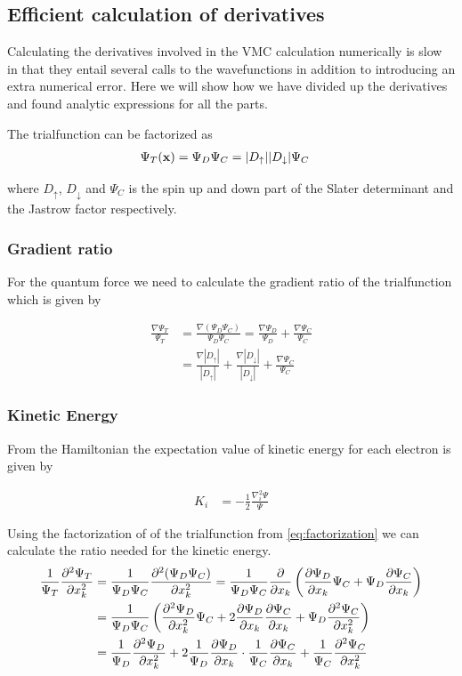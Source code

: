 \documentclass[11pt]{article}
\begin{document}
	\subsection{Efficient calculation of derivatives}
		Calculating the derivatives involved in the VMC calculation numerically is slow in that they entail several calls to the wavefunctions in addition to introducing an extra numerical error. Here we will show how we have divided up the derivatives and found analytic expressions for all the parts.

		The trialfunction can be factorized as
		\begin{align}
			\Psi_T(\vb{x}) &= \Psi_{D} \Psi_C= |D_\uparrow| |D_\downarrow| \Psi_C \label{eq:factorization}
		\end{align}

		where \(D_\uparrow\), \(D_\downarrow\) and \(\Psi_C\) is the spin up and down part of the Slater determinant and the Jastrow factor respectively.

		\subsubsection{Gradient ratio}
			For the quantum force we need to calculate the gradient ratio of the trialfunction which is given by

			\begin{align}
				\frac{\nabla \Psi_T}{ \Psi_T } &= \frac{\nabla( \Psi_D\Psi_C  )}{ \Psi_D\Psi_C } = \frac{ \nabla \Psi_D }{\Psi_D } + \frac{\nabla \Psi_C}{\Psi_C}
				\\
				&= \frac{\nabla |D_\uparrow|}{|D_\uparrow|} + \frac{ \nabla |D_\downarrow|}{|D_\downarrow|} + \frac{\nabla \Psi_C}{\Psi_C}
			\end{align}

		\subsubsection{Kinetic Energy}
			From the Hamiltonian the expectation value of kinetic energy for each electron is given by

			\begin{align}
				K_i &= - \frac{1}{2} \frac{\nabla^2_i \Psi}{\Psi}
			\end{align}

				Using the factorization of of the trialfunction from \eqref{eq:factorization} we can calculate the ratio needed for the kinetic energy.
			\begin{align}
				\frac{1}{\Psi_T}\pdv[2]{\Psi_T}{x_k} &= \frac{1}{\Psi_D\Psi_C} \pdv[2]{(\Psi_D\Psi_C)}{x_k} = \frac{1}{\Psi_D\Psi_C} \pdv{}{x_k} \left( \pdv{\Psi_D}{x_k} \Psi_C +\Psi_D \pdv{\Psi_C}{x_k} \right)
				\\
				&= \frac{ 1 }{\Psi_D\Psi_C} \left( \pdv[2]{\Psi_D}{x_k} \Psi_C   + 2 \pdv{ \Psi_D }{x_k}\pdv{ \Psi_C }{x_k} + \Psi_D\pdv[2]{\Psi_C}{x_k} \right)
				\\
				&= \frac{1}{\Psi_D}\pdv[2]{\Psi_D}{x_k}  + 2 \frac{1}{\Psi_D} \pdv{ \Psi_D }{x_k} \cdot \frac{1}{\Psi_C}\pdv{ \Psi_C }{x_k} +  \frac{1}{\Psi_C}\pdv[2]{\Psi_C}{x_k} \label{eq:laplacianIntermediate}
			\end{align}
\end{document}
